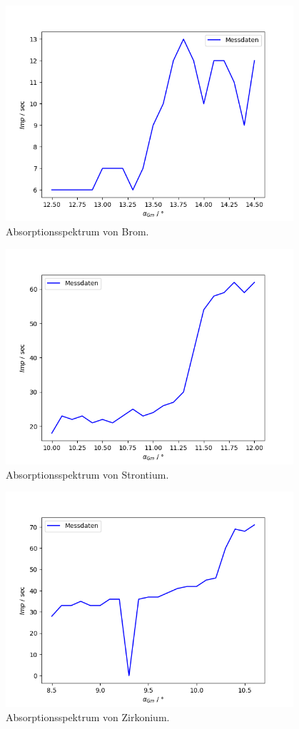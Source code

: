 \begin{figure}[H]
    \centering
    \includegraphics[height=80mm]{bilder/Brom.png}
    \caption{Absorptionsspektrum von Brom.\label{Abbildung6} }
\end{figure}

\begin{figure}[H]
    \centering
    \includegraphics[height=80mm]{bilder/Strontium.png}
    \caption{Absorptionsspektrum von Strontium.\label{Abbildung7} }
\end{figure}

\begin{figure}[H]
    \centering
    \includegraphics[height=80mm]{bilder/Zirkonium.png}
    \caption{Absorptionsspektrum von Zirkonium.\label{Abbildung8} }
\end{figure}

